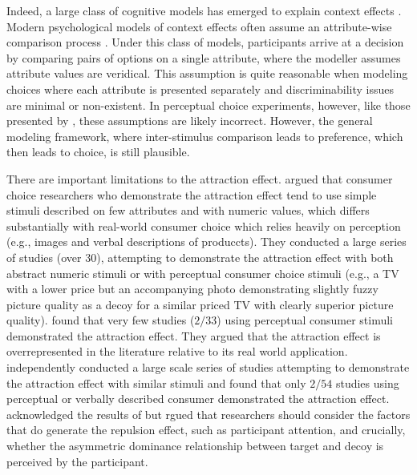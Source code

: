 Indeed, a large class of cognitive models has emerged to explain context effects \parencite{bhatiaAssociationsAccumulationPreference2013b,noguchiMultialternativeDecisionSampling2018a,trueblood2014multiattribute,wollschlager2NaryChoiceTree2012a,bergnerVAMPVotingAgent2019b,spektorHowSimilarityChoice2019}. Modern psychological models of context effects often assume an attribute-wise comparison process \parencite{roeMultialternativeDecisionField2001a,trueblood2013not,usherLossAversionInhibition2004a,bhatiaAssociationsAccumulationPreference2013b}. Under this class of models, participants arrive at a decision by comparing pairs of options on a single attribute, where the modeller assumes attribute values are veridical. This assumption is quite reasonable when modeling choices where each attribute is presented separately and discriminability issues are minimal or non-existent. In perceptual choice experiments, however, like those presented by \textcite{trueblood2013not}, these assumptions are likely incorrect. However, the general modeling framework, where inter-stimulus comparison leads to preference, which then leads to choice, is still plausible. 

There are important limitations to the attraction effect. \textcite{frederickLimitsAttraction2014b} argued that consumer choice researchers who demonstrate the attraction effect tend to use simple stimuli described on few attributes and with numeric values, which differs substantially with real-world consumer choice which relies heavily on perception (e.g., images and verbal descriptions of produccts). They conducted a large series of studies (over 30), attempting to demonstrate the attraction effect with both abstract numeric stimuli or with perceptual consumer choice stimuli (e.g., a TV with a lower price but an accompanying photo demonstrating slightly fuzzy picture quality as a decoy for a similar priced TV with clearly superior picture quality). \textcite{frederickLimitsAttraction2014b} found that very few studies ($2/33$) using perceptual consumer stimuli demonstrated the attraction effect. They argued that the attraction effect is overrepresented in the literature relative to its real world application. \textcite{yangMoreEvidenceChallenging2014} independently conducted a large scale series of studies attempting to demonstrate the attraction effect with similar stimuli and found that only $2/54$ studies using perceptual or verbally described consumer demonstrated the attraction effect. \textcite{simonson2014vices} acknowledged the results of \textcite{frederickLimitsAttraction2014b} but rgued that researchers should consider the factors that do generate the repulsion effect, such as participant attention, and crucially, whether the asymmetric dominance relationship between target and decoy is perceived by the participant. 

